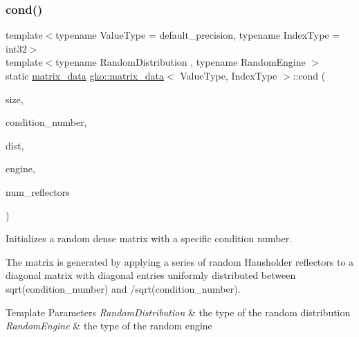 \subsubsection{\texorpdfstring{cond()}{cond()}\hspace{0.1cm}{\footnotesize\ttfamily [1/2]}}
{\footnotesize\ttfamily template$<$typename Value\+Type = default\+\_\+precision, typename Index\+Type = int32$>$ \\
template$<$typename Random\+Distribution , typename Random\+Engine $>$ \\
static \hyperlink{structgko_1_1matrix__data}{matrix\+\_\+data} \hyperlink{structgko_1_1matrix__data}{gko\+::matrix\+\_\+data}$<$ Value\+Type, Index\+Type $>$\+::cond (\begin{DoxyParamCaption}\item[{\hyperlink{namespacegko_a6e5c95df0ae4e47aab2f604a22d98ee7}{size\+\_\+type}}]{size,  }\item[{\hyperlink{namespacegko_adfcb75c44f6b6c701989419c166f6e7e}{remove\+\_\+complex}$<$ Value\+Type $>$}]{condition\+\_\+number,  }\item[{Random\+Distribution \&\&}]{dist,  }\item[{Random\+Engine \&\&}]{engine,  }\item[{\hyperlink{namespacegko_a6e5c95df0ae4e47aab2f604a22d98ee7}{size\+\_\+type}}]{num\+\_\+reflectors }\end{DoxyParamCaption})\hspace{0.3cm}{\ttfamily [static]}}



Initializes a random dense matrix with a specific condition number. 

The matrix is generated by applying a series of random Hausholder reflectors to a diagonal matrix with diagonal entries uniformly distributed between {\ttfamily sqrt(condition\+\_\+number)} and {/sqrt(condition\+\_\+number)}.


\begin{DoxyTemplParams}{Template Parameters}
{\em Random\+Distribution} & the type of the random distribution \\
\hline
{\em Random\+Engine} & the type of the random engine\\
\hline
\end{DoxyTemplParams}

